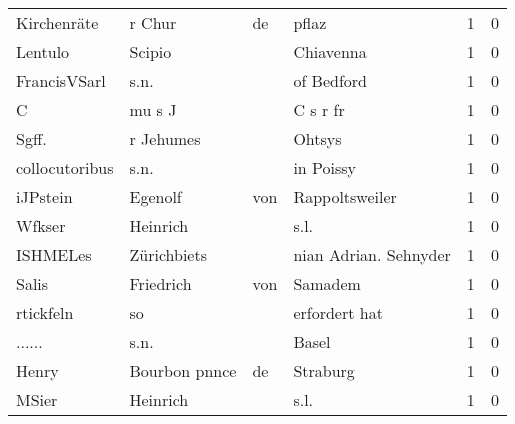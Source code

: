 \begin{center}
\begin{tiny}
\begin{longtabu}{llllrr}
              Kirchenräte &                             r Chur &          de &                                       pflaz &          1 &         0 \\
                  Lentulo &                             Scipio &             &                                   Chiavenna &          1 &         0 \\
             FrancisVSarl &                               s.n. &             &                                  of Bedford &          1 &         0 \\
                        C &                             mu s J &             &                                    C s r fr &          1 &         0 \\
                    Sgff. &                          r Jehumes &             &                                      Ohtsys &          1 &         0 \\
           collocutoribus &                               s.n. &             &                                   in Poissy &          1 &         0 \\
                 iJPstein &                            Egenolf &         von &                              Rappoltsweiler &          1 &         0 \\
                   Wfkser &                           Heinrich &             &                                        s.l. &          1 &         0 \\
                 ISHMELes &                        Zürichbiets &             &                       nian Adrian. Sehnyder &          1 &         0 \\
                    Salis &                          Friedrich &         von &                                     Samadem &          1 &         0 \\
                rtickfeln &                                 so &             &                               erfordert hat &          1 &         0 \\
                   ...... &                               s.n. &             &                                       Basel &          1 &         0 \\
                    Henry &                      Bourbon pnnce &          de &                                    Straburg &          1 &         0 \\
                    MSier &                           Heinrich &             &                                        s.l. &          1 &         0 \\

\end{longtabu}
\end{tiny}
\end{center}
